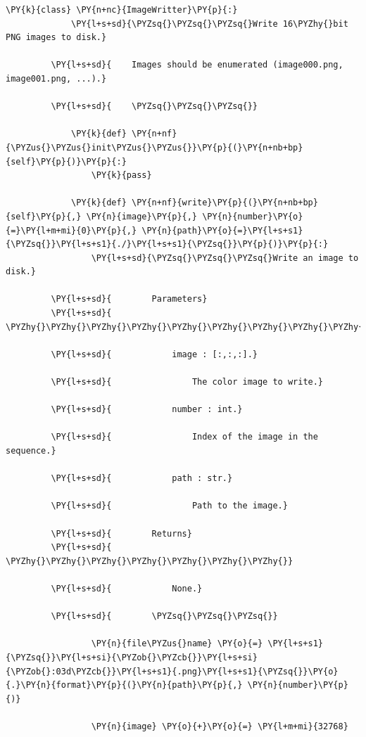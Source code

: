 {\begin{Verbatim}[commandchars=\\\{\}]
         \PY{k}{class} \PY{n+nc}{ImageWritter}\PY{p}{:}
             \PY{l+s+sd}{\PYZsq{}\PYZsq{}\PYZsq{}Write 16\PYZhy{}bit PNG images to disk.}
         
         \PY{l+s+sd}{    Images should be enumerated (image000.png, image001.png, ...).}
         
         \PY{l+s+sd}{    \PYZsq{}\PYZsq{}\PYZsq{}}
         
             \PY{k}{def} \PY{n+nf}{\PYZus{}\PYZus{}init\PYZus{}\PYZus{}}\PY{p}{(}\PY{n+nb+bp}{self}\PY{p}{)}\PY{p}{:}
                 \PY{k}{pass}
         
             \PY{k}{def} \PY{n+nf}{write}\PY{p}{(}\PY{n+nb+bp}{self}\PY{p}{,} \PY{n}{image}\PY{p}{,} \PY{n}{number}\PY{o}{=}\PY{l+m+mi}{0}\PY{p}{,} \PY{n}{path}\PY{o}{=}\PY{l+s+s1}{\PYZsq{}}\PY{l+s+s1}{./}\PY{l+s+s1}{\PYZsq{}}\PY{p}{)}\PY{p}{:}
                 \PY{l+s+sd}{\PYZsq{}\PYZsq{}\PYZsq{}Write an image to disk.}
         
         \PY{l+s+sd}{        Parameters}
         \PY{l+s+sd}{        \PYZhy{}\PYZhy{}\PYZhy{}\PYZhy{}\PYZhy{}\PYZhy{}\PYZhy{}\PYZhy{}\PYZhy{}\PYZhy{}}
         
         \PY{l+s+sd}{            image : [:,:,:].}
         
         \PY{l+s+sd}{                The color image to write.}
         
         \PY{l+s+sd}{            number : int.}
         
         \PY{l+s+sd}{                Index of the image in the sequence.}
         
         \PY{l+s+sd}{            path : str.}
         
         \PY{l+s+sd}{                Path to the image.}
         
         \PY{l+s+sd}{        Returns}
         \PY{l+s+sd}{        \PYZhy{}\PYZhy{}\PYZhy{}\PYZhy{}\PYZhy{}\PYZhy{}\PYZhy{}}
         
         \PY{l+s+sd}{            None.}
         
         \PY{l+s+sd}{        \PYZsq{}\PYZsq{}\PYZsq{}}
         
                 \PY{n}{file\PYZus{}name} \PY{o}{=} \PY{l+s+s1}{\PYZsq{}}\PY{l+s+si}{\PYZob{}\PYZcb{}}\PY{l+s+si}{\PYZob{}:03d\PYZcb{}}\PY{l+s+s1}{.png}\PY{l+s+s1}{\PYZsq{}}\PY{o}{.}\PY{n}{format}\PY{p}{(}\PY{n}{path}\PY{p}{,} \PY{n}{number}\PY{p}{)}
         
                 \PY{n}{image} \PY{o}{+}\PY{o}{=} \PY{l+m+mi}{32768}
                 

\end{Verbatim}}
